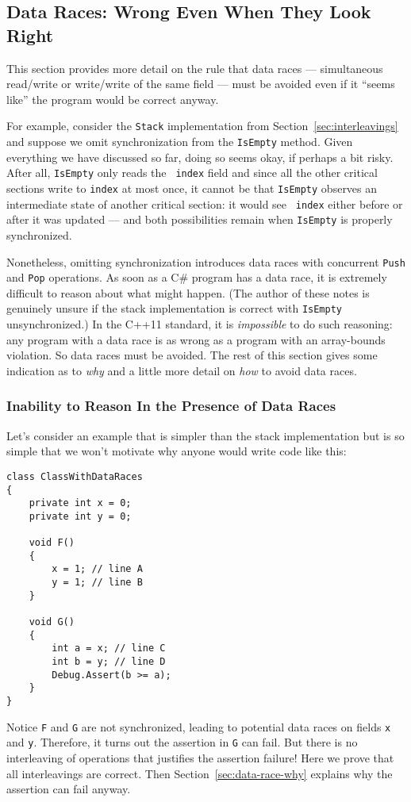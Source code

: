 \documentclass[10pt]{article}
\begin{document}
\subsection{Data Races: Wrong Even When They Look Right}
\label{sec:data-races}

This section provides more detail on the rule that data races ---
simultaneous read/write or write/write of the same field --- must be
avoided even if it ``seems like'' the program would be correct
anyway.  

For example, consider the {\tt Stack} implementation from Section~\ref{sec:interleavings}
and suppose we omit synchronization from the {\tt IsEmpty} method.
Given everything we have discussed so far, doing so seems okay, if
perhaps a bit risky.  After all, {\tt IsEmpty} only reads the {\tt
  index} field and since all the other critical sections write
to {\tt index} at most once, it cannot be that {\tt IsEmpty} observes an
intermediate state of another critical section: it would see {\tt
  index} either before or after it was updated --- and both
possibilities remain when {\tt IsEmpty} is properly synchronized.

Nonetheless, omitting synchronization introduces data races with
concurrent {\tt Push} and {\tt Pop} operations.  As soon as a C\#
program has a data race, it is extremely difficult to reason about
what might happen.  (The author of these notes is genuinely unsure if
the stack implementation is correct with {\tt IsEmpty}
unsynchronized.)  In the C++11 standard, it is
\emph{impossible} to do such reasoning: any program with a data race
is as wrong as a program with an array-bounds violation.  So data
races must be avoided.  The rest of this section gives some indication
as to \emph{why} and a little more detail on \emph{how} to avoid data
races.

\subsubsection{Inability to Reason In the Presence of Data Races}
\label{sec:data-race-example}

Let's consider an example that is simpler than the stack
implementation but is so simple that we won't motivate why anyone
would write code like this:
\begin{verbatim}
class ClassWithDataRaces
{
    private int x = 0;
    private int y = 0;

    void F()
    {
        x = 1; // line A
        y = 1; // line B
    }

    void G()
    {
        int a = x; // line C
        int b = y; // line D
        Debug.Assert(b >= a);
    }
}
\end{verbatim}
Notice {\tt F} and {\tt G} are not synchronized, leading to potential
data races on fields {\tt x} and {\tt y}.  Therefore, it turns out the
assertion in {\tt G} can fail.  But there is no interleaving of
operations that justifies the assertion failure!  Here we prove that
all interleavings are correct.  Then Section~\ref{sec:data-race-why}
explains why the assertion can fail anyway.
\end{document}
